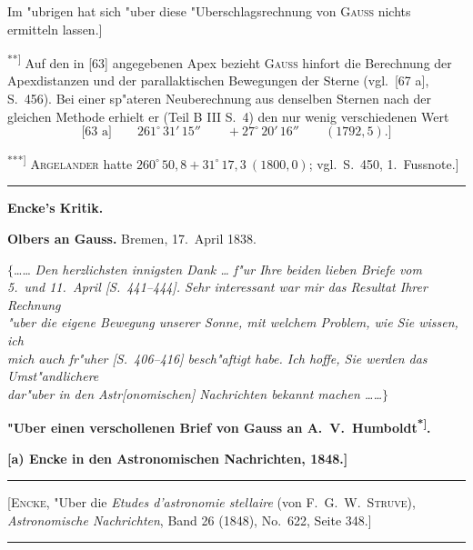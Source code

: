 \documentclass[12pt,a4paper]{article}
\theoremstyle{plain}
\theoremstyle{definition}
\theoremstyle{remark}
\begin{document}
{{Im "ubrigen hat sich "uber diese "Uberschlagsrechnung von \textsc{Gauss} nichts ermitteln lassen.]

\textsuperscript{**]} Auf den in [63] angegebenen Apex bezieht \textsc{Gauss} hinfort die Berechnung der Apexdistanzen und der parallaktischen Bewegungen der Sterne (vgl.\ [67 a], S.\ 456). Bei einer sp"ateren Neuberechnung aus denselben Sternen nach der gleichen Methode erhielt er (Teil B III S.\ 4) den nur wenig verschiedenen Wert
\[
\text{[63 a]}\qquad 261^{\circ}\,31'\,15'' \qquad +27^{\circ}\,20'\,16'' \qquad (1792{,}5).\text{]}
\]

\textsuperscript{***]} \textsc{Argelander} hatte $260^{\circ}\,50{,}8 + 31^{\circ}\,17{,}3\ (1800{,}0)$; vgl.\ S.\ 450, 1.\ Fussnote.]
}
\rule{\textwidth}{0.4pt}


\newpage
\begin{center}
\textbf{Encke's Kritik.}
\end{center}

\vspace{1em}
\begin{center}
\textbf{Olbers an Gauss.} \quad Bremen, 17.\ April 1838.
\end{center}

\noindent
$\{$\ldots{}\ldots{} {\itshape Den herzlichsten innigsten Dank \ldots{} f"ur Ihre beiden lieben Briefe vom} \\ {\itshape 5.\ und 11.\ April [S.\ 441--444]. Sehr interessant war mir das Resultat Ihrer Rechnung} \\ {\itshape "uber die eigene Bewegung unserer Sonne, mit welchem Problem, wie Sie wissen, ich} \\ {\itshape mich auch fr"uher [S.\ 406--416] besch"aftigt habe. Ich hoffe, Sie werden das Umst"andlichere} \\ {\itshape dar"uber in den Astr[onomischen] Nachrichten bekannt machen \ldots{}\ldots{}$\}$}

\vspace{2em}
\begin{center}
\textbf{"Uber einen verschollenen Brief von Gauss an A.\ V.\ Humboldt\textsuperscript{*]}.}

\textbf{[a) Encke in den Astronomischen Nachrichten, 1848.]}
\end{center}

\rule{\textwidth}{0.4pt}
\begin{center}
\small
[\textsc{Encke}, "Uber die {\itshape Etudes d'astronomie stellaire} (von F.\ G.\ W.\ \textsc{Struve}), {\itshape Astronomische Nachrichten}, Band 26 (1848), No.\ 622, Seite 348.]
\end{center}
\rule{\textwidth}{0.4pt}

}
\end{document}
